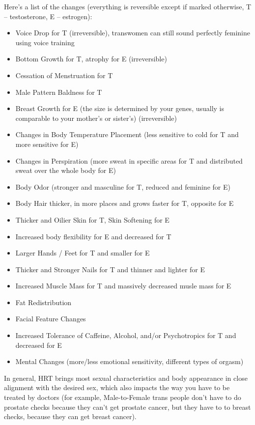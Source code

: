 \documentclass[12 pt, a4paper]{article}
\begin{document}
Here's a list of the changes (everything is reversible except if marked otherwise, T – testosterone, E – estrogen): 
\begin{itemize}
\item Voice Drop for T (irreversible), transwomen can still sound perfectly feminine using voice training 
\item Bottom Growth for T, atrophy for E (irreversible) 
\item Cessation of Menstruation for T 
\item Male Pattern Baldness for T 
\item Breast Growth for E (the size is determined by your genes, usually is comparable to your mother's or sister's) (irreversible) 
\item Changes in Body Temperature Placement (less sensitive to cold for T and more sensitive for E) 
\item Changes in Perspiration (more sweat in specific areas for T and distributed sweat over the whole body for E) 
\item Body Odor (stronger and masculine for T, reduced and feminine for E) 
\item Body Hair thicker, in more places and grows faster for T, opposite for E 
\item Thicker and Oilier Skin for T, Skin Softening for E 
\item Increased body flexibility for E and decreased for T 
\item Larger Hands / Feet for T and smaller for E 
\item Thicker and Stronger Nails for T and thinner and lighter for E 
\item Increased Muscle Mass for T and massively decreased musle mass for E 
\item Fat Redistribution
\item Facial Feature Changes 
\item Increased Tolerance of Caffeine, Alcohol, and/or Psychotropics for T and decreased for E 
\item Mental Changes (more/less emotional sensitivity, different types of orgasm) 
\end{itemize}

In general, HRT brings most sexual characteristics and body appearance in close alignment with the desired sex, which also impacts the way you have to be treated by doctors (for example, Male-to-Female trans people don't have to do prostate checks because they can't get prostate cancer, but they have to to breast checks, because they can get breast cancer). 
\end{document}

